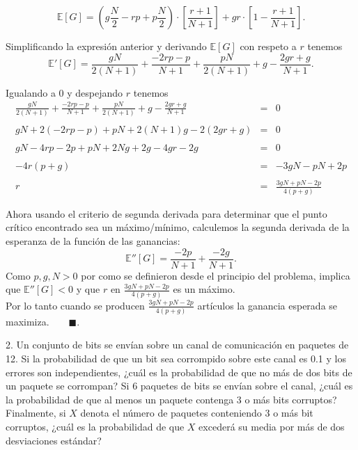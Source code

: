 \documentclass[11pt,letterpaper]{article}
\newcommand{\mE}{\mathbb{E}}
\newcommand{\fin}{$\blacksquare.$}
\begin{document}
\begin{itemize}
$$\mE[G]= \left( g\frac{N}{2}-rp+p\frac{N}{2}\right)\cdot\left[ \frac{r+1}{N+1}\right] +gr \cdot\left[1- \frac{r+1}{N+1} \right].$$

Simplificando la expresión anterior y derivando $\mE [G]$ con respeto a $r$ tenemos 
$$\mE'[G]= \frac{gN}{2(N+1)}+\frac{-2rp-p}{N+1}+\frac{pN}{2(N+1)}+g-\frac{2gr+g}{N+1}.$$

Igualando a 0 y despejando $r$ tenemos
\begin{equation*}
\begin{array}{rcl}
\frac{gN}{2(N+1)}+\frac{-2rp-p}{N+1}+\frac{pN}{2(N+1)}+g-\frac{2gr+g}{N+1}&=&0\\
&&\\
gN+2(-2rp-p)+pN+2(N+1)g-2(2gr+g)&=&0\\
&&\\
gN-4rp-2p+pN+2Ng+2g-4gr-2g&=&0\\
&&\\
-4r(p+g)&=&-3gN -pN+2p\\
&&\\
r&=&\frac{3gN +pN-2p}{4(p+g)}
\end{array}
\end{equation*}

Ahora usando el criterio de segunda derivada para determinar que el punto crítico encontrado sea un máximo/mínimo, calculemos la segunda derivada de la esperanza de la función de las ganancias:
$$\mE''[G]=\frac{-2p}{N+1}+\frac{-2g}{N+1}.$$
Como $p, g, N>0$ por como se definieron desde el principio del problema, implica que $\mE''[G]<0$ y que $r$ en $\frac{3gN +pN-2p}{4(p+g)}$ es un máximo. \\
Por lo tanto cuando se producen $\frac{3gN +pN-2p}{4(p+g)}$ artículos  la ganancia esperada se maximiza.\ \ \ \ \fin 

2. Un conjunto de bits se envían sobre un canal de comunicación en paquetes de 12. Si la probabilidad de que un bit sea corrompido sobre este canal es 0.1 y los errores son independientes,
¿cuál es la probabilidad de que no más de dos bits de un paquete se corrompan? Si 6 paquetes
de bits se envían sobre el canal, ¿cuál es la probabilidad de que al menos un paquete contenga 3 o más bits corruptos? Finalmente, si $X$ denota el número de paquetes conteniendo 3 o más bit corruptos, ¿cuál es la probabilidad de que $X$ excederá su media por más de dos desviaciones estándar? 


\end{itemize}
\end{document}
